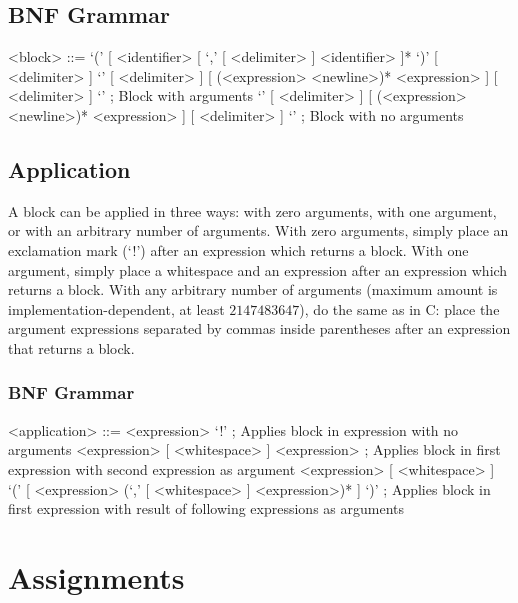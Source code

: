 \documentclass[letterpaper,titlepage]{scrreprt}
\begin{document}
\subsection{BNF Grammar}
\label{subsec:BlockBNF}

\begin{grammar}

<block> ::= `(' [ <identifier> [ `,' [ <delimiter> ] <identifier> ]* `)' [ <delimiter> ] `{' [ <delimiter> ] [ (<expression> <newline>)* <expression> ] [ <delimiter> ] `}' ; Block with arguments
\alt `{' [ <delimiter> ] [ (<expression> <newline>)* <expression> ] [ <delimiter> ] `}' ; Block with no arguments

\end{grammar}

\subsection{Application}
\label{subsec:Application}

A block can be applied in three ways: with zero arguments, with one argument, or with an arbitrary number of arguments. With zero arguments, simply place an exclamation mark (`!') after an expression which returns a block. With one argument, simply place a whitespace and an expression after an expression which returns a block. With any arbitrary number of arguments (maximum amount is implementation-dependent, at least $2147483647$), do the same as in C: place the argument expressions separated by commas inside parentheses after an expression that returns a block.

\subsubsection{BNF Grammar}
\label{subsubsec:ApplicationBNF}

\begin{grammar}

<application> ::= <expression> `!' ; Applies block in expression with no arguments
\alt <expression> [ <whitespace> ] <expression> ; Applies block in first expression with second expression as argument
\alt <expression> [ <whitespace> ] `(' [ <expression> (`,' [ <whitespace> ] <expression>)* ] `)' ; Applies block in first expression with result of following expressions as arguments

\end{grammar}

\section{Assignments}
\label{sec:Assignments}
\end{document}
